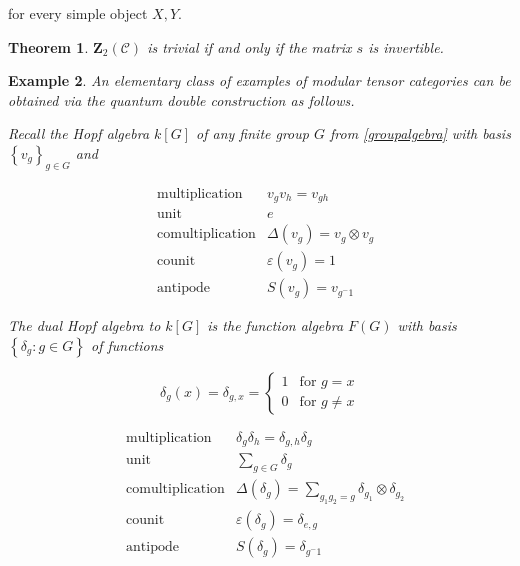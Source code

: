 \documentclass[]{article}
\newtheorem{theorem}{Theorem}[subsection]
\newtheorem{example}[theorem]{Example}
\numberwithin{equation}{subsection}
\begin{document}
for every simple object $X,Y$.

\begin{theorem}
    $\mathbf{Z}_2(\mathcal{C})$ is trivial if and only if the matrix $s$ is invertible. 
\end{theorem}

\begin{example}
    An elementary class of examples of modular tensor categories can be obtained via the quantum double construction as follows. 


    Recall the Hopf algebra $k[G]$ of any finite group $G$ from \ref{groupalgebra} with basis $\left\{ v_g \right\}_{g \in G}$ and

    \begin{align}
        &\text{multiplication} &v_g v_h = v_{gh} \\
        &\text{unit}           &e \\
        &\text{comultiplication} &\Delta(v_g) = v_g \otimes v_g \\
        &\text{counit}           &\varepsilon(v_g) = 1 \\
        &\text{antipode}         &S(v_g) = v_{g^-1}
    \end{align}

    The dual Hopf algebra to $k[G]$ is the function algebra $F(G)$ with basis $\left\{ \delta_g : g \in G \right\}$ of functions

    \begin{equation}
        \delta_g(x) = \delta_{g,x} = \begin{cases} 1 &\text{for $g = x$} \\ 0 &\text{for $g \neq x$} \end{cases}
    \end{equation}

    \begin{align}
        &\text{multiplication} &\delta_g \delta_h = \delta_{g,h} \delta_g\\
        &\text{unit}           &\sum_{g \in G} \delta_g \\
        &\text{comultiplication} &\Delta(\delta_g) = \sum_{g_1 g_2 = g} \delta_{g_1} \otimes \delta_{g_2}\\
        &\text{counit}           &\varepsilon(\delta_g) = \delta_{e,g} \\
        &\text{antipode}         &S(\delta_g) = \delta_{g^-1}
    \end{align}



\end{example}
\end{document}
